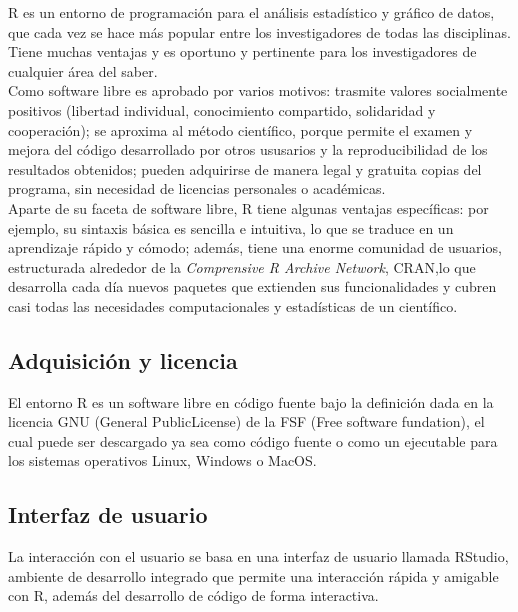 R es un entorno de programaci\'on para el an\'alisis estad\'istico y gr\'afico de datos, que cada vez se hace m\'as popular entre los investigadores de todas las disciplinas. Tiene muchas ventajas y es oportuno y pertinente para los investigadores de cualquier \'area del saber. \\

Como software libre es aprobado por varios motivos: trasmite valores socialmente positivos (libertad individual, conocimiento compartido, solidaridad y cooperaci\'on); se aproxima al m\'etodo cient\'ifico, porque permite el examen y mejora del c\'odigo desarrollado por otros ususarios y la reproducibilidad de los resultados obtenidos; pueden adquirirse de manera legal y gratuita copias del programa, sin necesidad de licencias personales o acad\'emicas. \\

Aparte de su faceta de software libre, R tiene algunas ventajas espec\'ificas: por ejemplo, su sintaxis b\'asica es sencilla e intuitiva, lo que se traduce en un aprendizaje r\'apido y c\'omodo; adem\'as, tiene una enorme comunidad de usuarios, estructurada alrededor de la \textit{Comprensive R Archive Network}, CRAN,lo que desarrolla cada d\'ia nuevos paquetes que extienden sus funcionalidades y cubren casi todas las necesidades computacionales y estad\'isticas de un cient\'ifico.

\subsection{Adquisici\'on y licencia}

El entorno R es un software libre en c\'odigo fuente bajo la definici\'on dada en la licencia GNU (General PublicLicense) de la FSF (Free software fundation), el cual puede ser descargado ya sea como c\'odigo fuente o como un ejecutable para los sistemas operativos Linux, Windows o MacOS.

\subsection{Interfaz de usuario}

La interacci\'on con el usuario se basa en una interfaz de usuario llamada RStudio, ambiente de desarrollo integrado que permite una interacci\'on r\'apida y amigable con R, adem\'as del desarrollo de c\'odigo de forma interactiva.

